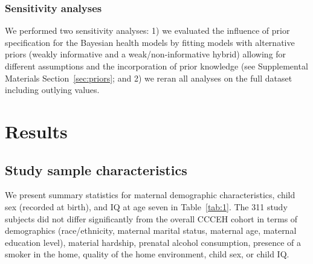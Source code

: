\subsubsection{Sensitivity analyses}
We performed two sensitivity analyses: 1) we evaluated the influence of prior specification for the Bayesian health models by fitting models with alternative priors (weakly informative and a weak/non-informative hybrid) allowing for different assumptions and the incorporation of prior knowledge (see Supplemental Materials Section~\ref{sec:priors}; and 2) we reran all analyses on the full dataset including outlying values.

\section{Results}
\subsection{Study sample characteristics}

We present summary statistics for maternal demographic characteristics, child sex (recorded at birth), and IQ at age seven in Table~\ref{tab:1}. The 311 study subjects did not differ significantly from the overall CCCEH cohort in terms of demographics (race/ethnicity, maternal marital status, maternal age, maternal education level), material hardship, prenatal alcohol consumption, presence of a smoker in the home, quality of the home environment, child sex, or child IQ. 

